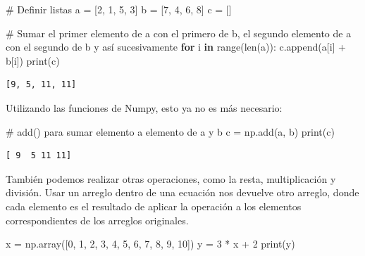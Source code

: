 \documentclass[
  letterpaper,
  DIV=11,
  numbers=noendperiod]{scrreprt}
\newenvironment{Shaded}{\begin{snugshade}}{\end{snugshade}}
\newcommand{\BuiltInTok}[1]{\textcolor[rgb]{0.00,0.23,0.31}{#1}}
\newcommand{\CommentTok}[1]{\textcolor[rgb]{0.37,0.37,0.37}{#1}}
\newcommand{\ControlFlowTok}[1]{\textcolor[rgb]{0.00,0.23,0.31}{\textbf{#1}}}
\newcommand{\DecValTok}[1]{\textcolor[rgb]{0.68,0.00,0.00}{#1}}
\newcommand{\KeywordTok}[1]{\textcolor[rgb]{0.00,0.23,0.31}{\textbf{#1}}}
\newcommand{\NormalTok}[1]{\textcolor[rgb]{0.00,0.23,0.31}{#1}}
\newcommand{\OperatorTok}[1]{\textcolor[rgb]{0.37,0.37,0.37}{#1}}
\begin{document}
\begin{Shaded}
\begin{Highlighting}[]
\CommentTok{\# Definir listas}
\NormalTok{a }\OperatorTok{=}\NormalTok{ [}\DecValTok{2}\NormalTok{, }\DecValTok{1}\NormalTok{, }\DecValTok{5}\NormalTok{, }\DecValTok{3}\NormalTok{]}
\NormalTok{b }\OperatorTok{=}\NormalTok{ [}\DecValTok{7}\NormalTok{, }\DecValTok{4}\NormalTok{, }\DecValTok{6}\NormalTok{, }\DecValTok{8}\NormalTok{]}
\NormalTok{c }\OperatorTok{=}\NormalTok{ []}

\CommentTok{\# Sumar el primer elemento de a con el primero de b, el segundo elemento de a con el segundo de b y así sucesivamente}
\ControlFlowTok{for}\NormalTok{ i }\KeywordTok{in} \BuiltInTok{range}\NormalTok{(}\BuiltInTok{len}\NormalTok{(a)):}
\NormalTok{  c.append(a[i] }\OperatorTok{+}\NormalTok{ b[i])}
\BuiltInTok{print}\NormalTok{(c)}
\end{Highlighting}
\end{Shaded}

\begin{verbatim}
[9, 5, 11, 11]
\end{verbatim}

Utilizando las funciones de Numpy, esto ya no es más necesario:

\begin{Shaded}
\begin{Highlighting}[]
\CommentTok{\# add() para sumar elemento a elemento de a y b}
\NormalTok{c }\OperatorTok{=}\NormalTok{ np.add(a, b)}
\BuiltInTok{print}\NormalTok{(c)}
\end{Highlighting}
\end{Shaded}

\begin{verbatim}
[ 9  5 11 11]
\end{verbatim}

También podemos realizar otras operaciones, como la resta,
multiplicación y división. Usar un arreglo dentro de una ecuación nos
devuelve otro arreglo, donde cada elemento es el resultado de aplicar la
operación a los elementos correspondientes de los arreglos originales.

\begin{Shaded}
\begin{Highlighting}[]
\NormalTok{x }\OperatorTok{=}\NormalTok{ np.array([}\DecValTok{0}\NormalTok{,  }\DecValTok{1}\NormalTok{, }\DecValTok{2}\NormalTok{, }\DecValTok{3}\NormalTok{, }\DecValTok{4}\NormalTok{, }\DecValTok{5}\NormalTok{, }\DecValTok{6}\NormalTok{, }\DecValTok{7}\NormalTok{, }\DecValTok{8}\NormalTok{, }\DecValTok{9}\NormalTok{, }\DecValTok{10}\NormalTok{])}
\NormalTok{y }\OperatorTok{=} \DecValTok{3} \OperatorTok{*}\NormalTok{ x }\OperatorTok{+} \DecValTok{2}
\BuiltInTok{print}\NormalTok{(y)}
\end{Highlighting}
\end{Shaded}
\end{document}
